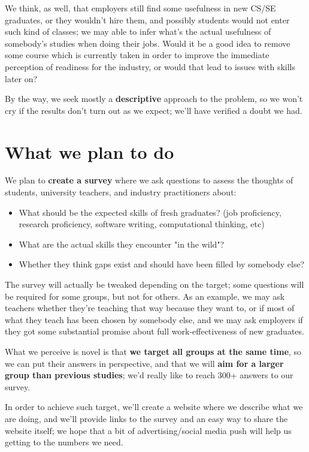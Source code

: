\documentclass{sigchi}
\begin{document}
 We think, as well, that employers still find some usefulness in new CS/SE graduates, or they wouldn't hire them, and possibly students would not enter such kind of classes; we may able to infer what's the actual usefulness of somebody's studies when doing their jobs. Would it be a good idea to remove some course which is currently taken in order to improve the immediate perception of readiness for the industry, or would that lead to issues with skills later on?
 
 By the way, we seek mostly a \textbf{descriptive} approach to the problem, so we won't cry if the results don't turn out as we expect; we'll have verified a doubt we had.
 
 \section{What we plan to do}
 
 We plan to \textbf{create a survey} where we ask questions to assess the thoughts of students, university teachers, and industry practitioners about:
 \begin{itemize}
 	\item What should be the expected skills of fresh graduates? (job proficiency, research proficiency, software writing, computational thinking, etc)
 	\item What are the actual skills they encounter "in the wild"?
 	\item Whether they think gaps exist and should have been filled by somebody else?

 \end{itemize} 
 
 The survey will actually be tweaked depending on the target; some questions will be required for some groups, but not for others. As an example, we may ask teachers whether they're teaching that way because they want to, or if most of what they teach has been chosen by somebody else, and we may ask employers if they got some substantial promise about full work-effectiveness of new graduates.
 
 What we perceive is novel is that \textbf{we target all groups at the same time}, so we can put their answers in perspective, and that we will \textbf{aim for a larger group than previous studies}; we'd really like to reach 300+ answers to our survey.
 
 In order to achieve such target, we'll create a website where we describe what we are doing, and we'll provide links to the survey and an easy way to share the website itself; we hope that a bit of advertising/social media push will help us getting to the numbers we need.
 
\end{document}
